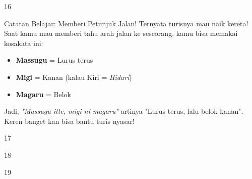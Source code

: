 \begin{convobox}{16}
    \noindent

    \vspace{1.5em}
\end{convobox}

\begin{lessonbox}{Catatan Belajar: Memberi Petunjuk Jalan!}
    Ternyata turisnya mau naik kereta! Saat kamu mau memberi tahu arah jalan ke seseorang, kamu bisa memakai kosakata ini:
    \begin{itemize}
        \item \textbf{Massugu} = Lurus terus
        \item \textbf{Migi} = Kanan (kalau Kiri = \textit{Hidari})
        \item \textbf{Magaru} = Belok
    \end{itemize}
    Jadi, \textit{"Massugu itte, migi ni magaru"} artinya "Lurus terus, lalu belok kanan". Keren banget kan bisa bantu turis nyasar!
\end{lessonbox}

\begin{convobox}{17}
    \noindent
      
     

    \vspace{1.5em}
\end{convobox}

\begin{convobox}{18}
    \noindent
      
      

    \vspace{1.5em}
\end{convobox}

\begin{convobox}{19}
    \noindent
      
     

    \vspace{1.5em}
\end{convobox}


